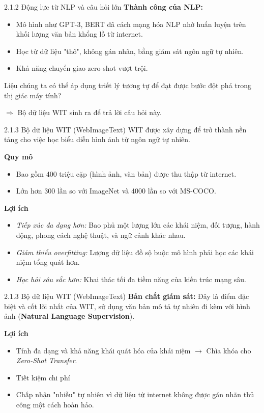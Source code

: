 \begin{frame}{2.1.2 Động lực từ NLP và câu hỏi lớn}
    \textbf{Thành công của NLP:}
    \begin{itemize}
        \item Mô hình như GPT-3, BERT đã cách mạng hóa NLP nhờ huấn luyện trên khối lượng văn bản khổng lồ từ internet.
        \item Học từ dữ liệu "thô", không gán nhãn, bằng giám sát ngôn ngữ tự nhiên.
        \item Khả năng chuyển giao zero-shot vượt trội.
    \end{itemize}

    Liệu chúng ta có thể áp dụng triết lý tương tự để đạt được bước đột phá trong thị giác máy tính?
    
    $\Rightarrow$ Bộ dữ liệu WIT sinh ra để trả lời câu hỏi này.
\end{frame}

\begin{frame}{2.1.3 Bộ dữ liệu WIT (WebImageText)}
    WIT được xây dựng để trở thành nền tảng cho việc học biểu diễn hình ảnh từ ngôn ngữ tự nhiên.

    \bigskip
    \textbf{Quy mô}
    \begin{itemize}
        \item Bao gồm 400 triệu cặp (hình ảnh, văn bản) được thu thập từ internet.
        \item Lớn hơn 300 lần so với ImageNet và 4000 lần so với MS-COCO.
    \end{itemize}
    \bigskip
    \textbf{Lợi ích}
    \begin{itemize}
        \item \textit{Tiếp xúc đa dạng hơn:} Bao phủ một lượng lớn các khái niệm, đối tượng, hành động, phong cách nghệ thuật, và ngữ cảnh khác nhau.
        \item \textit{Giảm thiểu overfitting:} Lượng dữ liệu đồ sộ buộc mô hình phải học các khái niệm tổng quát hơn.
        \item \textit{Học hỏi sâu sắc hơn:} Khai thác tối đa tiềm năng của kiến trúc mạng sâu.
    \end{itemize}
\end{frame}

\begin{frame}{2.1.3 Bộ dữ liệu WIT (WebImageText)}
    \textbf{Bản chất giám sát:} Đây là điểm đặc biệt và cốt lõi nhất của WIT, sử dụng văn bản mô tả tự nhiên đi kèm với hình ảnh (\textbf{Natural Language Supervision}).
    
    \bigskip
    \textbf{Lợi ích}
    \begin{itemize}
        \item Tính đa dạng và khả năng khái quát hóa của khái niệm $\rightarrow$ Chìa khóa cho \textit{Zero-Shot Transfer}.
        \item Tiết kiệm chi phí
        \item Chấp nhận "nhiễu" tự nhiên vì dữ liệu từ internet không được gán nhãn thủ công một cách hoàn hảo.
    \end{itemize}
\end{frame}

